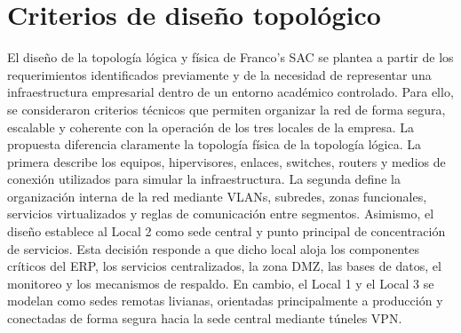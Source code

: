 \documentclass[11pt, a4paper, oneside]{report}
\begin{document}
\section{Criterios de diseño topológico} El diseño de la topología lógica y física de Franco's SAC se plantea a partir de los requerimientos identificados previamente y de la necesidad de representar una infraestructura empresarial dentro de un entorno académico controlado. Para ello, se consideraron criterios técnicos que permiten organizar la red de forma segura, escalable y coherente con la operación de los tres locales de la empresa. La propuesta diferencia claramente la topología física de la topología lógica. La primera describe los equipos, hipervisores, enlaces, switches, routers y medios de conexión utilizados para simular la infraestructura. La segunda define la organización interna de la red mediante VLANs, subredes, zonas funcionales, servicios virtualizados y reglas de comunicación entre segmentos. Asimismo, el diseño establece al Local 2 como sede central y punto principal de concentración de servicios. Esta decisión responde a que dicho local aloja los componentes críticos del ERP, los servicios centralizados, la zona DMZ, las bases de datos, el monitoreo y los mecanismos de respaldo. En cambio, el Local 1 y el Local 3 se modelan como sedes remotas livianas, orientadas principalmente a producción y conectadas de forma segura hacia la sede central mediante túneles VPN. 

\renewcommand{\arraystretch}{1.3}
\footnotesize
{}
\end{document}
